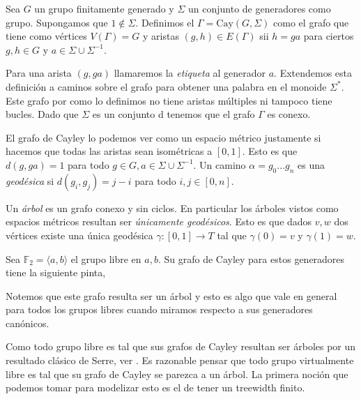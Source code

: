 \documentclass[tesis.tex]{subfiles}
\newcommand{\fg}{grupo finitamente generado }
\begin{document}
\begin{deff}
	Sea $G$ un \fg y $\Sigma$ un conjunto de generadores como grupo. 
	Supongamos que $1 \notin \Sigma$.
	Definimos el  $\Gamma = \text{Cay}(G,\Sigma)$ como el grafo que tiene como vértices $V(\Gamma) = G$ y aristas $(g,h) \in E(\Gamma)$ sii $h=ga$ para ciertos $g,h \in G$ y $a \in \Sigma \cup \Sigma^{-1}$. 
\end{deff}

Para una arista $(g,ga)$ llamaremos la \emph{etiqueta} al generador $a$.
Extendemos esta definición a caminos sobre el grafo para obtener una palabra en el monoide $\Sigma^*$.
Este grafo por como lo definimos no tiene aristas múltiples ni tampoco tiene bucles.
Dado que $\Sigma$ es un conjunto d tenemos que el grafo $\Gamma$ es conexo.

El grafo de Cayley lo podemos ver como un espacio métrico justamente si hacemos que todas las aristas sean isométricas a $[0,1]$. 
Esto es que $d(g,ga) = 1$ para todo $g \in G, a \in \Sigma \cup \Sigma^{-1}$. 
Un camino $\alpha = g_0 \dots g_n$ es una \emph{geodésica} si $d(g_i,g_j) = j-i$ para todo $i,j \in [0,n]$.


Un \emph{árbol} es un grafo conexo y sin ciclos. 
En particular los árboles vistos como espacios métricos resultan ser \emph{únicamente geodésicos}. 
Esto es que dados $v,w$ dos vértices existe una única geodésica $\gamma:[0,1] \to T$ tal que $\gamma(0)=v$ y $\gamma(1)=w$.

\begin{ej}
	Sea $\mathbb F_2 = \langle a, b \rangle$ el grupo libre en $a,b$. Su grafo de Cayley para estos generadores tiene la siguiente pinta,
	\bigskip
	\begin{center}
	\end{center}
	
	
	 Notemos que este grafo resulta ser un árbol y esto es algo que vale en general para todos los grupos libres cuando miramos respecto a sus generadores canónicos.
\end{ej}

Como todo grupo libre es tal que sus grafos de Cayley resultan ser árboles por un resultado clásico de Serre, ver \cite{}.
Es razonable pensar que todo grupo virtualmente libre es tal que su grafo de Cayley se parezca a un árbol. 
La primera noción que podemos tomar para modelizar esto es el de tener un treewidth finito.
\end{document}
